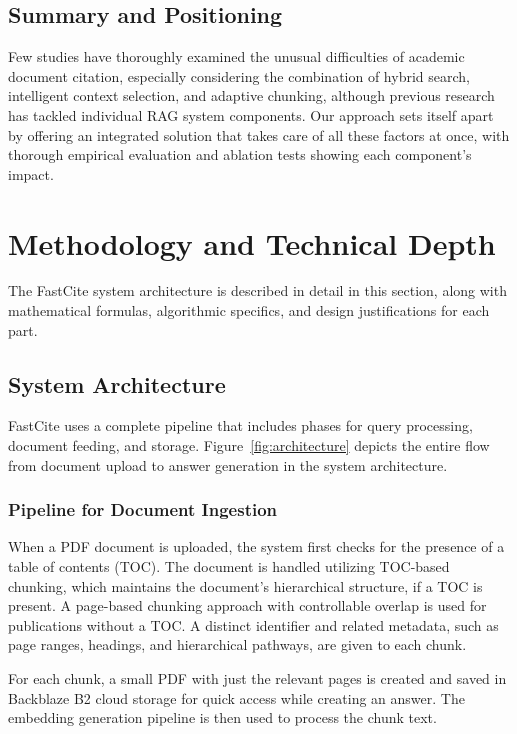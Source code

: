 \documentclass[runningheads]{llncs}
\begin{document}
\subsection{Summary and Positioning}

Few studies have thoroughly examined the unusual difficulties of academic document citation, especially considering the combination of hybrid search, intelligent context selection, and adaptive chunking, although previous research has tackled individual RAG system components. Our approach sets itself apart by offering an integrated solution that takes care of all these factors at once, with thorough empirical evaluation and ablation tests showing each component's impact.

%
%
\section{Methodology and Technical Depth}
The FastCite system architecture is described in detail in this section, along with mathematical formulas, algorithmic specifics, and design justifications for each part.
\subsection{System Architecture}

FastCite uses a complete pipeline that includes phases for query processing, document feeding, and storage. Figure~\ref{fig:architecture} depicts the entire flow from document upload to answer generation in the system architecture.

\subsubsection{Pipeline for Document Ingestion}

When a PDF document is uploaded, the system first checks for the presence of a table of contents (TOC). The document is handled utilizing TOC-based chunking, which maintains the document's hierarchical structure, if a TOC is present. A page-based chunking approach with controllable overlap is used for publications without a TOC. A distinct identifier and related metadata, such as page ranges, headings, and hierarchical pathways, are given to each chunk.

For each chunk, a small PDF with just the relevant pages is created and saved in Backblaze B2 cloud storage for quick access while creating an answer. The embedding generation pipeline is then used to process the chunk text.
\end{document}
